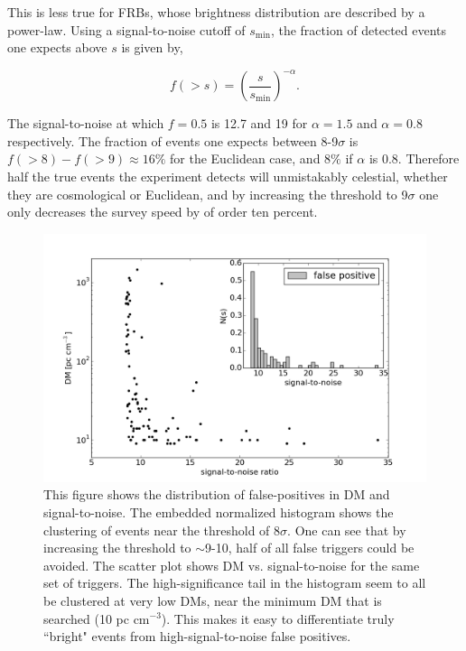 This is less true for FRBs, whose brightness distribution 
are described by a power-law. Using a signal-to-noise 
cutoff of $s_\mathrm{min}$, the fraction 
of detected events one expects above $s$ is given by,

\begin{equation}
f(>s) = \left(\frac{s}{s_\mathrm{min}}\right)^{-\alpha}.
\end{equation}

\noindent The signal-to-noise at which $f=0.5$ is 
12.7 and 19 for $\alpha=1.5$ and $\alpha=0.8$ respectively. 
The fraction of events one expects between 8-9$\sigma$ is 
$f(>8) - f(>9) \approx 16\%$ for the Euclidean case, 
and $8\%$ if $\alpha$ is 0.8. Therefore half the true events 
the experiment detects will unmistakably celestial, whether they 
are cosmological or Euclidean, and by increasing the threshold 
to 9$\sigma$ one only decreases the survey speed by of order 
ten percent. 

\begin{figure}[!h]
\label{fig-scatterhist}
\begin{center}
\includegraphics[trim={0in 0in 0in 0in}, scale=0.5]
{./figures/beamforming/dm_dist_falsepositives.png}
\vspace{0.0cm}
\caption[abc]{This figure shows the distribution 
     of false-positives in DM and signal-to-noise. The 
     embedded normalized histogram shows the clustering of events 
     near the threshold of 8$\sigma$. One can see that by 
     increasing the threshold to $\sim$9-10, half of all 
     false triggers could be avoided. The scatter plot shows 
     DM vs. signal-to-noise for the same set of triggers. The 
     high-significance tail in the histogram seem to all be clustered 
     at very low DMs, near the minimum DM that is searched 
     (10 pc cm$^{-3}$). This makes it easy to differentiate truly 
     ``bright" events from high-signal-to-noise false positives.}
\end{center}
\end{figure}

